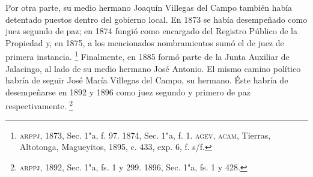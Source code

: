 \documentclass[14pt,twoside,final]{extbook} %
\let\oldfootnote\footnote
\renewcommand\footnote[1]{%
\oldfootnote{\hspace{1mm}#1}}
\begin{document}
Por otra parte, su medio hermano Joaquín Villegas del Campo también había detentado puestos dentro del gobierno local. En 1873 se había desempeñado como juez segundo de paz; en 1874 fungió como encargado del Registro Público de la Propiedad y, en 1875, a los mencionados nombramientos sumó el de juez de primera instancia.\footnote{\textsc{arppj}, 1873, Sec. 1"a, f. 97. 1874, Sec. 1"a, f. 1. \textsc{agev, acam}, Tierras, Altotonga, Magueyitos, 1895, c. 433, exp. 6, f. s/f.} Finalmente, en 1885 formó parte de la Junta Auxiliar de Jalacingo, al lado de su medio hermano José Antonio. El mismo camino político habría de seguir José María Villegas del Campo, su hermano. Éste habría de desempeñarse en 1892 y 1896 como juez segundo y primero de paz respectivamente.\footnote{\textsc{arppj}, 1892, Sec. 1"a, fs. 1 y 299. 1896, Sec. 1"a, fs. 1 y 428.}
\end{document}
